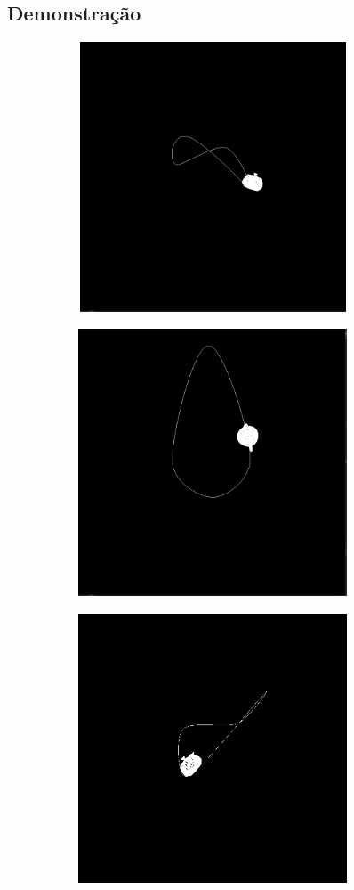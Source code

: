 \documentclass[11pt,a4paper]{report}
\begin{document}
\subsection{Demonstração}

\vspace{1cm}
\begin{figure}[H]
\centering
\begin{subfigure}{0.5\textwidth}
  \centering
  \includegraphics[width = 8cm,height = 8cm]{catmul_teapot1.png}
  \caption{\texttt{}}
  \label{fig:catmul_teapot1}
\end{subfigure}%
\begin{subfigure}{0.5\textwidth}
  \centering
  \includegraphics[width = 8cm,height = 8cm]{catmul_teapot2.png}
  \caption{\texttt{}}
  \label{fig:catmul_teapot1}
\end{subfigure}
\begin{subfigure}{0.5\textwidth}
  \centering
  \includegraphics[width = 8cm,height = 8cm]{catmul_teapot3.png}

\end{subfigure}
\end{figure}
\end{document}
